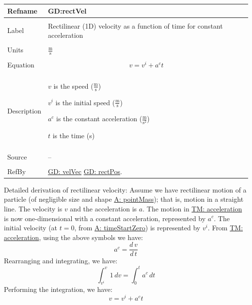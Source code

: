 \documentclass[12pt]{article}
\begin{document}
\noindent \begin{minipage}{\textwidth}
\begin{tabular}{p{} p{}}
\toprule \textbf{Refname} & \textbf{GD:rectVel}
\label{GD:rectVel}
\\ \midrule \\
Label & Rectilinear (1D) velocity as a function of time for constant acceleration
\\ \midrule \\
Units & $\frac{\text{m}}{\text{s}}$
\\ \midrule \\
Equation & \begin{displaymath}
           v={v^{i}}+{a^{c}} t
           \end{displaymath}
\\ \midrule \\
Description & \begin{symbDescription}
              \item{$v$ is the speed ($\frac{\text{m}}{\text{s}}$)}
              \item{${v^{i}}$ is the initial speed ($\frac{\text{m}}{\text{s}}$)}
              \item{${a^{c}}$ is the constant acceleration ($\frac{\text{m}}{\text{s}^{2}}$)}
              \item{$t$ is the time (s)}
              \end{symbDescription}
\\ \midrule \\
Source & --
\\ \midrule \\
RefBy & \hyperref[GD:velVec]{GD: velVec} \hyperref[GD:rectPos]{GD: rectPos}.
\\ \bottomrule \end{tabular}
\end{minipage}
Detailed derivation of rectilinear velocity:
Assume we have rectilinear motion of a particle (of negligible size and shape \hyperref[pointMass]{A: pointMass}); that is, motion in a straight line. The velocity is $v$ and the acceleration is $a$. The motion in \hyperref[TM:acceleration]{TM: acceleration} is now one-dimensional with a constant acceleration, represented by ${a^{c}}$. The initial velocity (at $t=0$, from \hyperref[timeStartZero]{A: timeStartZero}) is represented by ${v^{i}}$. From \hyperref[TM:acceleration]{TM: acceleration}, using the above symbols we have:
\begin{displaymath}
{a^{c}}=\frac{d\,v}{d\,t}
\end{displaymath}
Rearranging and integrating, we have:
\begin{displaymath}
\int_{{v^{i}}}^{v}{1}\,dv=\int_{0}^{t}{{a^{c}}}\,dt
\end{displaymath}
Performing the integration, we have:
\begin{displaymath}
v={v^{i}}+{a^{c}} t
\end{displaymath}
\par~
\end{document}
